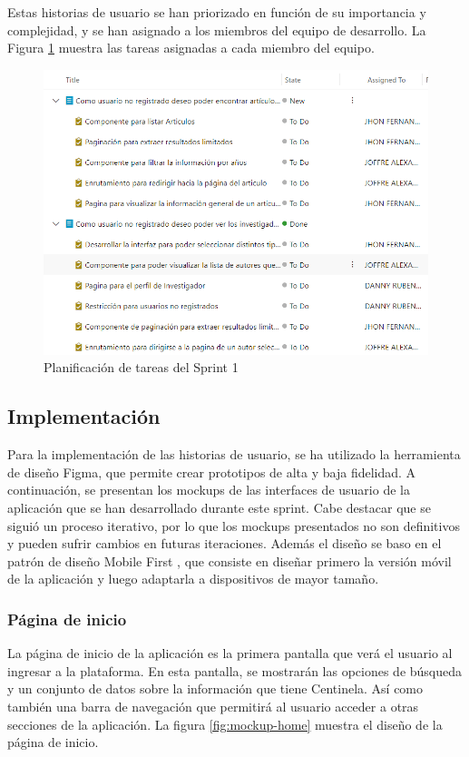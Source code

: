 Estas historias de usuario se han priorizado en función de su importancia y complejidad, y se han asignado a los miembros del equipo de desarrollo. La Figura \ref{fig:azure-board-sprint-1} muestra las tareas asignadas a cada miembro del equipo.
\begin{figure}[H]
    \centering
    \includegraphics[scale=0.9]{../02Figures/02Chapter/Sprints/Sprint-1/fig_azure-board-sprint-1.png}
    \caption{Planificación de tareas del Sprint 1}
    \label{fig:azure-board-sprint-1}
\end{figure}

\subsection{Implementación}
Para la implementación de las historias de usuario, se ha utilizado la herramienta de diseño Figma, que permite crear prototipos de alta y baja fidelidad. 
A continuación, se presentan los mockups de las interfaces de usuario de la aplicación que se han desarrollado durante este sprint.
Cabe destacar que se siguió un proceso iterativo, por lo que los mockups presentados no son definitivos y pueden sufrir cambios en futuras iteraciones.
Además el diseño se baso en el patrón de diseño Mobile First \cite{MOBILE-FIRST}, que consiste en diseñar primero la versión móvil de la aplicación y luego adaptarla a dispositivos de mayor tamaño.

\subsubsection{Página de inicio}
La página de inicio de la aplicación es la primera pantalla que verá el usuario al ingresar a la plataforma. 
En esta pantalla, se mostrarán las opciones de búsqueda y un conjunto de datos sobre la información que tiene Centinela. Así como también una barra de navegación que permitirá al usuario acceder a otras secciones de la aplicación. 
La figura \ref{fig:mockup-home} muestra el diseño de la página de inicio.

